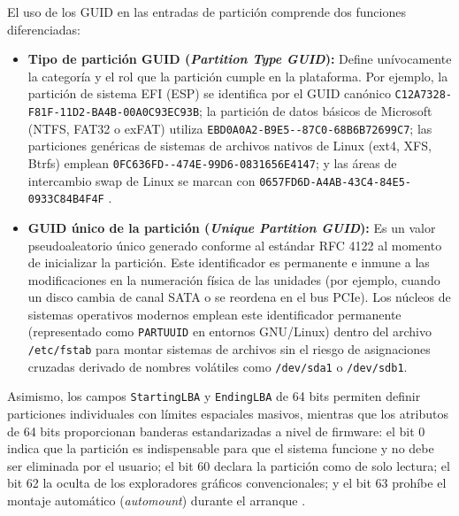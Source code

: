 \documentclass[12pt]{article}
\begin{document}
El uso de los GUID en las entradas de partición comprende dos funciones diferenciadas:
\begin{itemize}[noitemsep, topsep=2pt]
    \item \textbf{Tipo de partición GUID (\textit{Partition Type GUID}):} Define unívocamente la categoría y el rol que la partición cumple en la plataforma. Por ejemplo, la partición de sistema EFI (ESP) se identifica por el GUID canónico \texttt{\small C12A7328-\allowbreak F81F-\allowbreak 11D2-\allowbreak BA4B-\allowbreak 00A0C93EC93B}; la partición de datos básicos de Microsoft (NTFS, FAT32 o exFAT) utiliza \texttt{\small EBD0A0A2-\allowbreak B9E5--\allowbreak 87C0-\allowbreak 68B6B72699C7}; las particiones genéricas de sistemas de archivos nativos de Linux (ext4, XFS, Btrfs) emplean \texttt{\small 0FC636FD--\allowbreak 474E-\allowbreak 99D6-\allowbreak 0831656E4147}; y las áreas de intercambio swap de Linux se marcan con \texttt{\small 0657FD6D-\allowbreak A4AB-\allowbreak 43C4-\allowbreak 84E5-\allowbreak 0933C84B4F4F} \parencite[\S 5.3.3, p.\ 119]{uefi2024specification}.
    \item \textbf{GUID único de la partición (\textit{Unique Partition GUID}):} Es un valor pseudoaleatorio único generado conforme al estándar RFC 4122 al momento de inicializar la partición. Este identificador es permanente e inmune a las modificaciones en la numeración física de las unidades (por ejemplo, cuando un disco cambia de canal SATA o se reordena en el bus PCIe). Los núcleos de sistemas operativos modernos emplean este identificador permanente (representado como \texttt{PARTUUID} en entornos GNU/Linux) dentro del archivo \texttt{/etc/fstab} para montar sistemas de archivos sin el riesgo de asignaciones cruzadas derivado de nombres volátiles como \texttt{/dev/sda1} o \texttt{/dev/sdb1}.
\end{itemize}

Asimismo, los campos \texttt{StartingLBA} y \texttt{EndingLBA} de 64 bits permiten definir particiones individuales con límites espaciales masivos, mientras que los atributos de 64 bits proporcionan banderas estandarizadas a nivel de firmware: el bit 0 indica que la partición es indispensable para que el sistema funcione y no debe ser eliminada por el usuario; el bit 60 declara la partición como de solo lectura; el bit 62 la oculta de los exploradores gráficos convencionales; y el bit 63 prohíbe el montaje automático (\textit{automount}) durante el arranque \parencite[\S 5.3.3, p.\ 120]{uefi2024specification}.
\end{document}
